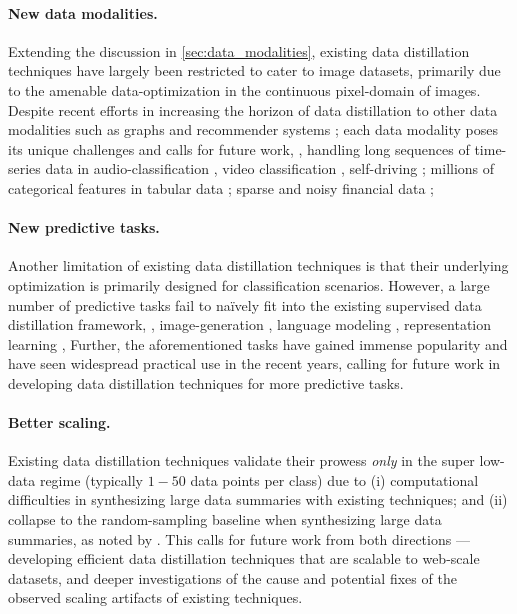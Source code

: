 \documentclass[10pt]{article} %
\begin{document}
\paragraph{New data modalities.} Extending the discussion in \cref{sec:data_modalities}, existing data distillation techniques have largely been restricted to cater to image datasets, primarily due to the amenable data-optimization in the continuous pixel-domain of images.
Despite recent efforts in increasing the horizon of data distillation to other data modalities such as graphs \citep{graph_distill_kdd_22, graph_distill_iclr_22} and recommender systems \citep{inf_ae}; each data modality poses its unique challenges and calls for future work, \eg, handling long sequences of time-series data in audio-classification \citep{audio_classification}, video classification \citep{video_classification}, self-driving \citep{waymo}; millions of categorical features in tabular data \citep{dcnv2}; sparse and noisy financial data \citep{stock}; \etc

\paragraph{New predictive tasks.}  Another limitation of existing data distillation techniques is that their underlying optimization is primarily designed for classification scenarios. However, a large number of predictive tasks fail to na\"ively fit into the existing supervised data distillation framework, \eg, image-generation \citep{dalle, stable_diffusion}, language modeling \citep{bert, gpt, llama}, representation learning \citep{byol, simclr}, \etc Further, the aforementioned tasks have gained immense popularity and have seen widespread practical use in the recent years, calling for future work in developing data distillation techniques for more predictive tasks.

\paragraph{Better scaling.} Existing data distillation techniques validate their prowess \emph{only} in the super low-data regime (typically $1-50$ data points per class) due to (i) computational difficulties in synthesizing large data summaries with existing techniques; and (ii) collapse to the random-sampling baseline when synthesizing large data summaries, as noted by \citet{dc_bench}. This calls for future work from both directions --- developing efficient data distillation techniques that are scalable to web-scale datasets, and deeper investigations of the cause and potential fixes of the observed scaling artifacts of existing techniques.
\end{document}
